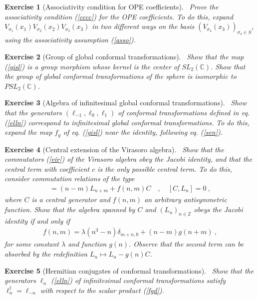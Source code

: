 \documentclass[12pt,a4paper,notitlepage]{report}
\newcommand \Z {\mathbb{Z}}
\newcommand \C {\mathbb{C}}
\numberwithin{equation}{section}
\theoremstyle{break}
\newtheorem{exo}{Exercise}[chapter]
\begin{document}
\begin{exo}[Associativity condition for OPE coefficients]
 ~\label{exocccc}
Prove the associativity condition (\ref{cccc}) for the OPE coefficients.
To do this, expand $V_{\sigma_1}(x_1)V_{\sigma_2}(x_2)V_{\sigma_3}(x_3) $ in two different ways on the basis $(V_{\sigma_4}(x_3))_{\sigma_4\in S}$, using the associativity assumption (\ref{asso}).
\end{exo}

\begin{exo}[Group of global conformal transformations]
 ~\label{exoiso}
Show that the map (\ref{gisl}) is a group morphism whose kernel is the center of $SL_2(\C)$.
Show that the group of global conformal transformations of the sphere is isomorphic to $PSL_2(\C)$. 
\end{exo}

\begin{exo}[Algebra of infinitesimal global conformal transformations]
 ~\label{exomoz}
Show that the generators $(\ell_{-1},\ell_0,\ell_1)$ of conformal transformations defined in eq. (\ref{elln}) correspond to infinitesimal global conformal transformations.
To do this, expand the map $f_g$ of eq. (\ref{gisl}) near the identity, following eq. (\ref{sen}).
\end{exo}


\begin{exo}[Central extension of the Virasoro algebra]
~\label{exovir}
 Show that the commutators (\ref{vir}) of the Virasoro algebra obey the Jacobi identity, and that the central term with coefficient $c$ is the only possible central term.
To do this, consider commutation relations of the type
\begin{align}
 [L_n,L_m] =(n-m)L_{n+m} + f(n,m) C  \quad , \quad [C,L_n]=0\ ,
\end{align}
where $C$ is a central generator and $f(n,m)$ an arbitrary antisymmetric function.
Show that the algebra spanned by $C$ and $(L_n)_{n\in\Z}$ obeys the Jacobi identity if and only if 
\begin{align}
 f(n,m) = \lambda (n^3-n)\delta_{m+n,0} + (n-m)g(n+m)\ ,
\end{align}
for some constant $\lambda$ and function $g(n)$.
Observe that the second term can be absorbed by the redefinition $L_n\mapsto L_n-g(n)C$.
\end{exo}

\begin{exo}[Hermitian conjugates of conformal transformations]
 ~\label{exolnd}
Show that the generators $\ell_n$ (\ref{elln}) of infinitesimal conformal transformations satisfy $\ell_n^\dagger =\ell_{-n}$ with respect to the scalar product (\ref{fgd}).
\end{exo}
\end{document}
